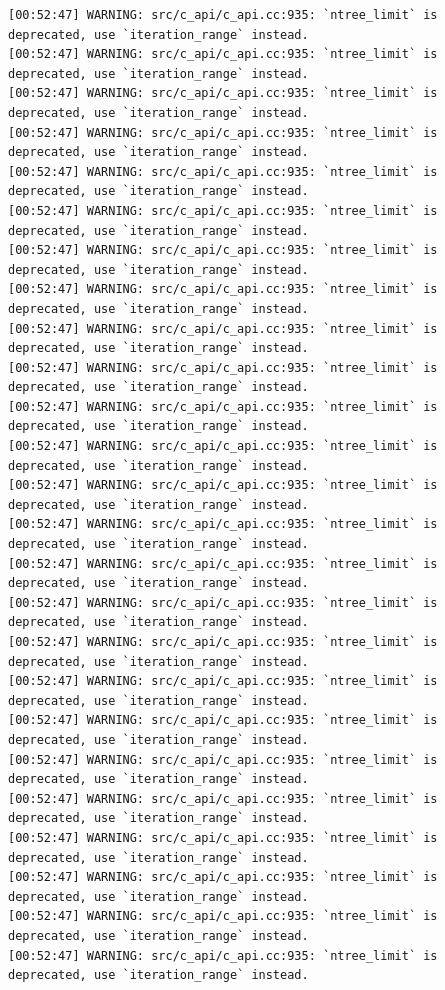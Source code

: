 \documentclass[
  letterpaper,
  DIV=11,
  numbers=noendperiod]{scrartcl}
\begin{document}
\begin{verbatim}
[00:52:47] WARNING: src/c_api/c_api.cc:935: `ntree_limit` is deprecated, use `iteration_range` instead.
[00:52:47] WARNING: src/c_api/c_api.cc:935: `ntree_limit` is deprecated, use `iteration_range` instead.
[00:52:47] WARNING: src/c_api/c_api.cc:935: `ntree_limit` is deprecated, use `iteration_range` instead.
[00:52:47] WARNING: src/c_api/c_api.cc:935: `ntree_limit` is deprecated, use `iteration_range` instead.
[00:52:47] WARNING: src/c_api/c_api.cc:935: `ntree_limit` is deprecated, use `iteration_range` instead.
[00:52:47] WARNING: src/c_api/c_api.cc:935: `ntree_limit` is deprecated, use `iteration_range` instead.
[00:52:47] WARNING: src/c_api/c_api.cc:935: `ntree_limit` is deprecated, use `iteration_range` instead.
[00:52:47] WARNING: src/c_api/c_api.cc:935: `ntree_limit` is deprecated, use `iteration_range` instead.
[00:52:47] WARNING: src/c_api/c_api.cc:935: `ntree_limit` is deprecated, use `iteration_range` instead.
[00:52:47] WARNING: src/c_api/c_api.cc:935: `ntree_limit` is deprecated, use `iteration_range` instead.
[00:52:47] WARNING: src/c_api/c_api.cc:935: `ntree_limit` is deprecated, use `iteration_range` instead.
[00:52:47] WARNING: src/c_api/c_api.cc:935: `ntree_limit` is deprecated, use `iteration_range` instead.
[00:52:47] WARNING: src/c_api/c_api.cc:935: `ntree_limit` is deprecated, use `iteration_range` instead.
[00:52:47] WARNING: src/c_api/c_api.cc:935: `ntree_limit` is deprecated, use `iteration_range` instead.
[00:52:47] WARNING: src/c_api/c_api.cc:935: `ntree_limit` is deprecated, use `iteration_range` instead.
[00:52:47] WARNING: src/c_api/c_api.cc:935: `ntree_limit` is deprecated, use `iteration_range` instead.
[00:52:47] WARNING: src/c_api/c_api.cc:935: `ntree_limit` is deprecated, use `iteration_range` instead.
[00:52:47] WARNING: src/c_api/c_api.cc:935: `ntree_limit` is deprecated, use `iteration_range` instead.
[00:52:47] WARNING: src/c_api/c_api.cc:935: `ntree_limit` is deprecated, use `iteration_range` instead.
[00:52:47] WARNING: src/c_api/c_api.cc:935: `ntree_limit` is deprecated, use `iteration_range` instead.
[00:52:47] WARNING: src/c_api/c_api.cc:935: `ntree_limit` is deprecated, use `iteration_range` instead.
[00:52:47] WARNING: src/c_api/c_api.cc:935: `ntree_limit` is deprecated, use `iteration_range` instead.
[00:52:47] WARNING: src/c_api/c_api.cc:935: `ntree_limit` is deprecated, use `iteration_range` instead.
[00:52:47] WARNING: src/c_api/c_api.cc:935: `ntree_limit` is deprecated, use `iteration_range` instead.
[00:52:47] WARNING: src/c_api/c_api.cc:935: `ntree_limit` is deprecated, use `iteration_range` instead.

\end{verbatim}
\end{document}
